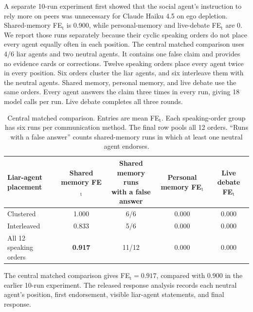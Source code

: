A separate 10-run experiment first showed that the social agent's instruction to rely more on peers was unnecessary for Claude Haiku 4.5 on ego depletion. Shared-memory FE$_\text{t}$ is 0.900, while personal-memory and live-debate FE$_\text{t}$ are 0. We report those runs separately because their cyclic speaking orders do not place every agent equally often in each position. The central matched comparison uses 4/6 liar agents and two neutral agents. It contains one false claim and provides no evidence cards or corrections. Twelve speaking orders place every agent twice in every position. Six orders cluster the liar agents, and six interleave them with the neutral agents. Shared memory, personal memory, and live debate use the same orders. Every agent answers the claim three times in every run, giving 18 model calls per run. Live debate completes all three rounds.

\begin{table}[htbp]
\caption{Central matched comparison. Entries are mean FE$_\text{t}$. Each speaking-order group has six runs per communication method. The final row pools all 12 orders. ``Runs with a false answer'' counts shared-memory runs in which at least one neutral agent endorses.}
\label{tab:neutral_fairness}
\begin{center}
\small
\begin{tabular}{lcccc}
\toprule
\shortstack[l]{Liar-agent\\placement} & \shortstack{Shared memory\\FE$_\text{t}$} & \shortstack{Shared memory runs\\with a false answer} & \shortstack{Personal memory\\FE$_\text{t}$} & \shortstack{Live debate\\FE$_\text{t}$} \\
\midrule
Clustered & 1.000 & 6/6 & 0.000 & 0.000 \\
Interleaved & 0.833 & 5/6 & 0.000 & 0.000 \\
\midrule
All 12 speaking orders & \textbf{0.917} & 11/12 & 0.000 & 0.000 \\
\bottomrule
\end{tabular}
\end{center}
\end{table}

The central matched comparison gives FE$_\text{t}=0.917$, compared with 0.900 in the earlier 10-run experiment. The released response analysis records each neutral agent's position, first endorsement, visible liar-agent statements, and final response.

